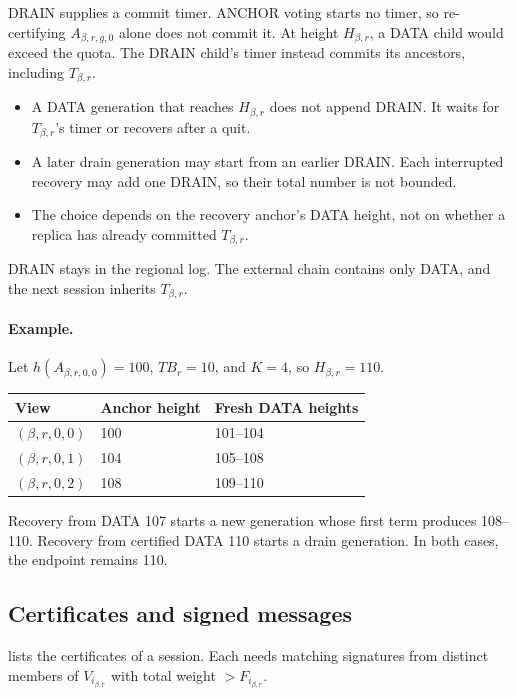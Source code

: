 \documentclass[11pt,a4paper]{article}
\newcommand{\TB}{\mathit{TB}}
\begin{document}
DRAIN supplies a commit timer. ANCHOR voting starts no timer, so
re-certifying $A_{\beta,r,g,0}$ alone does not commit it. At height $H_{\beta,r}$, a
DATA child would exceed the quota. The DRAIN child's timer instead
commits its ancestors, including $T_{\beta,r}$.
\begin{itemize}
\item A DATA generation that reaches $H_{\beta,r}$ does not append DRAIN.
It waits for $T_{\beta,r}$'s timer or recovers after a quit.
\item A later drain generation may start from an earlier DRAIN.
Each interrupted recovery may add one DRAIN, so their total number
is not bounded.
\item The choice depends on the recovery anchor's DATA height, not on
whether a replica has already committed $T_{\beta,r}$.
\end{itemize}
DRAIN stays in the regional log. The external chain contains only DATA,
and the next session inherits $T_{\beta,r}$.

\paragraph{Example.}
Let $h(A_{\beta,r,0,0})=100$, $\TB_r=10$, and $K=4$, so $H_{\beta,r}=110$.
\begin{center}\small
\begin{tabular}{@{}lll@{}}\toprule
View & Anchor height & Fresh DATA heights\\\midrule
$(\beta,r,0,0)$ & 100 & 101--104\\
$(\beta,r,0,1)$ & 104 & 105--108\\
$(\beta,r,0,2)$ & 108 & 109--110\\\bottomrule
\end{tabular}
\end{center}
Recovery from DATA 107 starts a new generation whose first term produces
108--110. Recovery from certified DATA 110 starts a drain generation.
In both cases, the endpoint remains 110.

\subsection{Certificates and signed messages}
\label{sec:certificates}
 lists the certificates of a session. Each needs
matching signatures from distinct members of $V_{i_{\beta,r}}$ with total weight
$>F_{i_{\beta,r}}$.
\end{document}
